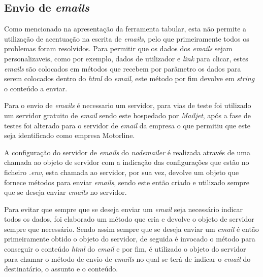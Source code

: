 \subsection{Envio de \textit{emails}}
Como mencionado na apresentação da ferramenta tabular, esta não permite a utilização de acentuação na escrita de \textit{emails}, pelo que primeiramente todos os problemas foram resolvidos. Para permitir que os dados dos \textit{emails} sejam personalizaveis, como por exemplo, dados de utilizador e \textit{link} para clicar, estes \textit{emails} são colocados em métodos que recebem por parâmetro os dados para serem colocados dentro do \textit{html} do \textit{email}, este método por fim devolve em \textit{string} o conteúdo a enviar.

Para o envio de \textit{emails} é necessario um servidor, para vias de teste foi utilizado um servidor gratuito de \textit{email} sendo este hospedado por \textit{Mailjet}, após a fase de testes foi alterado para o servidor de \textit{email} da empresa o que permitiu que este seja identificado como empresa Motorline.

A configuração do servidor de \textit{emails} do \textit{nodemailer} é realizada através de uma chamada ao objeto de servidor com a indicação das configurações que estão no ficheiro \textit{.env}, esta chamada ao servidor, por sua vez, devolve um objeto que fornece métodos para enviar \textit{emails}, sendo este então criado e utilizado sempre que se deseja enviar \textit{emails} no servidor.


Para evitar que sempre que se deseja enviar um \textit{email} seja necessário indicar todos os dados, foi elaborado um método que cria e devolve o objeto de servidor sempre que necessário. Sendo assim sempre que se deseja enviar um \textit{email} é então primeiramente obtido o objeto do servidor, de seguida é invocado o método para conseguir o conteúdo \textit{html} do \textit{email} e por fim, é utilizado o objeto do servidor para chamar o método de envio de \textit{emails} no qual se terá de indicar o \textit{email} do destinatário, o assunto e o conteúdo.
